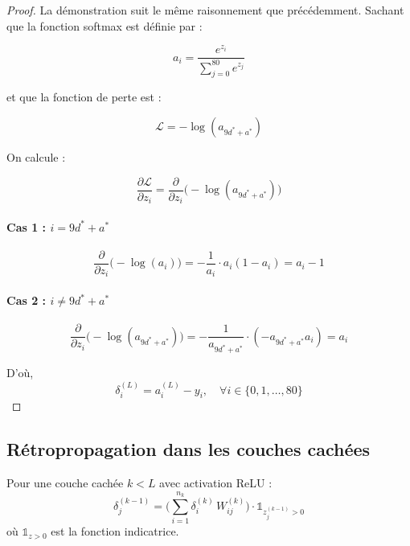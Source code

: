 \documentclass[12pt,a4paper]{report}
\numberwithin{equation}{section}
\begin{document}
\begin{proof}
La démonstration suit le même raisonnement que précédemment. Sachant que la fonction softmax est définie par :

$$a_i = \frac{e^{z_i}}{\sum_{j=0}^{80} e^{z_j}}$$

et que la fonction de perte est :

$$\mathcal{L} = -\log(a_{9d^* + a^*})$$

On calcule :

$$\frac{\partial \mathcal{L}}{\partial z_i} = \frac{\partial}{\partial z_i} \Big( -\log(a_{9d^* + a^*}) \Big)$$

\paragraph{Cas 1 : $i = 9d^* + a^*$}

$$\frac{\partial}{\partial z_i} \big(-\log(a_i)\big) = - \frac{1}{a_i} \cdot a_i(1 - a_i) = a_i - 1$$

\paragraph{Cas 2 : $i \neq 9d^* + a^*$}

$$\frac{\partial}{\partial z_i} \big(-\log(a_{9d^* + a^*})\big) = - \frac{1}{a_{9d^* + a^*}} \cdot (-a_{9d^* + a^*} a_i) = a_i$$

D'où,
$$\boxed{\delta^{(L)}_i = a^{(L)}_i - y_i, \quad \forall i \in \{0, 1, \ldots, 80\}}$$
\end{proof}

\subsection{Rétropropagation dans les couches cachées}

\begin{theorem}
Pour une couche cachée $k < L$ avec activation ReLU :
$$\delta^{(k-1)}_j = \Big(\sum_{i=1}^{n_k} \delta^{(k)}_i \, W^{(k)}_{ij}\Big) \cdot \mathbb{1}_{z^{(k-1)}_j > 0}$$
où $\mathbb{1}_{z > 0}$ est la fonction indicatrice.
\end{theorem}
\end{document}
